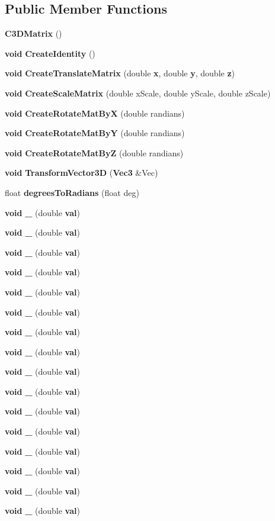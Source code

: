 \subsection*{Public Member Functions}
\begin{DoxyCompactItemize}
\item 
{\bf C3\+D\+Matrix} ()
\item 
{\bf void} {\bf Create\+Identity} ()
\item 
{\bf void} {\bf Create\+Translate\+Matrix} (double {\bf x}, double {\bf y}, double {\bf z})
\item 
{\bf void} {\bf Create\+Scale\+Matrix} (double x\+Scale, double y\+Scale, double z\+Scale)
\item 
{\bf void} {\bf Create\+Rotate\+Mat\+By\+X} (double randians)
\item 
{\bf void} {\bf Create\+Rotate\+Mat\+By\+Y} (double randians)
\item 
{\bf void} {\bf Create\+Rotate\+Mat\+By\+Z} (double randians)
\item 
{\bf void} {\bf Transform\+Vector3\+D} ({\bf Vec3} \&Vec)
\item 
float {\bf degrees\+To\+Radians} (float deg)
\item 
{\bf void} {\bf \+\_} (double {\bf val})
\item 
{\bf void} {\bf \+\_} (double {\bf val})
\item 
{\bf void} {\bf \+\_} (double {\bf val})
\item 
{\bf void} {\bf \+\_} (double {\bf val})
\item 
{\bf void} {\bf \+\_} (double {\bf val})
\item 
{\bf void} {\bf \+\_} (double {\bf val})
\item 
{\bf void} {\bf \+\_} (double {\bf val})
\item 
{\bf void} {\bf \+\_} (double {\bf val})
\item 
{\bf void} {\bf \+\_} (double {\bf val})
\item 
{\bf void} {\bf \+\_} (double {\bf val})
\item 
{\bf void} {\bf \+\_} (double {\bf val})
\item 
{\bf void} {\bf \+\_} (double {\bf val})
\item 
{\bf void} {\bf \+\_} (double {\bf val})
\item 
{\bf void} {\bf \+\_} (double {\bf val})
\item 
{\bf void} {\bf \+\_} (double {\bf val})
\item 
{\bf void} {\bf \+\_} (double {\bf val})
\end{DoxyCompactItemize}
